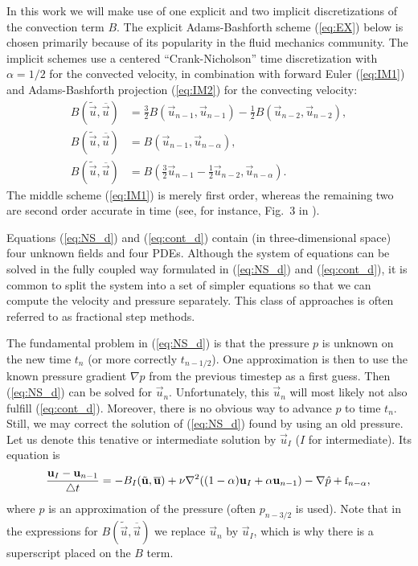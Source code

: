 In this work we will make use of one explicit and two
implicit discretizations of the convection term $B$. 
The explicit  Adams-Bashforth scheme
(\ref{eq:EX}) below is chosen primarily because of its
popularity in the fluid mechanics community. The implicit schemes use
a centered ``Crank-Nicholson'' time discretization with $\alpha=1/2$
for the convected velocity,
in combination with
forward
Euler (\ref{eq:IM1}) and Adams-Bashforth projection (\ref{eq:IM2}) for
the convecting velocity:
\begin{align}
\label{eq:EX} 
B(\tilde{\vec{u}},\overline{\vec{u}}) &=
\frac{3}{2}B(\vec{u}_{n-1},\vec{u}_{n-1})-
\frac{1}{2}B(\vec{u}_{n-2},\vec{u}_{n-2}), \\
\label{eq:IM1} 
B(\tilde{\vec{u}},\overline{\vec{u}}) &=
B(\vec{u}_{n-1},\vec{u}_{n-\alpha}), \\
 \label{eq:IM2} 
B(\tilde{\vec{u}},\overline{\vec{u}}) &=
B(\frac{3}{2}\vec{u}_{n-1}-\frac{1}{2}\vec{u}_{n-2},\vec{u}_{n-\alpha}).
\end{align}
The middle scheme (\ref{eq:IM1}) is merely first order, 
whereas the remaining two are second order accurate in time 
(see, for instance, Fig.~3 in \cite{simo94}).

Equations (\ref{eq:NS_d}) and (\ref{eq:cont_d}) contain (in
three-dimensional space) four unknown fields and four PDEs.
Although the system of equations can be solved in the fully coupled
way formulated in  (\ref{eq:NS_d}) and (\ref{eq:cont_d}),
it is common to split the system into a set of simpler equations
so that we can compute the velocity and pressure separately.
This class of approaches is often referred to as fractional step
methods.

The fundamental problem in (\ref{eq:NS_d}) is that the pressure
$p$ is unknown on the new time $t_n$ (or more correctly $t_{n-1/2}$).
One approximation is then to use the
known pressure gradient $\nabla p$ from the previous timestep as a first guess. Then (\ref{eq:NS_d}) can
be solved for $\vec{u}_n$. Unfortunately, this $\vec{u}_n$ will most 
likely not also fulfill
(\ref{eq:cont_d}). Moreover, there is no obvious way to advance $p$
to time $t_n$. Still, we may correct the solution of (\ref{eq:NS_d})
found by using an old pressure. Let us denote this tenative or
intermediate solution
by $\vec{u}_I$ ($I$ for intermediate). Its equation is
\begin{equation} 
\label{eq:NS_FS} 
\frac{{\vec{u}}_{I}-\vec{u}_{n-1}}{\triangle t} = 
- B_I(\tilde{\vec{u}},\overline{\vec{u}}) + 
\nu \nabla^2 ((1-\alpha) {\vec{u}}_{I} + \alpha \vec{u}_{n-1}) 
-\nabla \hat{p} + \text{f}_{n-\alpha} , \thinspace
\end{equation}
where $\hat{p}$ is an approximation of the pressure (often $p_{n-3/2}$ is used). Note that in the expressions for $B(\tilde{\vec{u}},\overline{\vec{u}})$
we replace $\vec{u}_n$ by $\vec{u}_I$, which is why there is
a superscript placed on the $B$ term.

